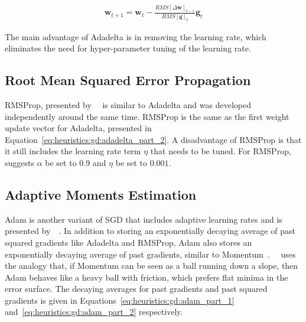 \begin{equation}
      \label{eq:heuristics:gd:adadelta_part_6}
      \begin{split}
            \boldsymbol{w}_{t+1} = \boldsymbol{w}_{t} - \frac{RMS[\Delta \boldsymbol{w}]_{t-1}}{RMS[\boldsymbol{g}]_{t}} \boldsymbol{g}_{t}
      \end{split}
\end{equation}

The main advantage of \acs{Adadelta} is in removing the learning rate, which eliminates the need for hyper-parameter tuning of the learning rate.

\subsection{Root Mean Squared Error Propagation}\label{sec:heuristics:rmsprop}

\Acf{RMSProp}, presented by~\citeauthor{ref:hinton:2012}~\cite{ref:hinton:2012} is similar to \acs{Adadelta}  and was developed independently around the same time. \acs{RMSProp} is the same as the first weight update vector for \acs{Adadelta}, presented in Equation~\eqref{eq:heuristics:gd:adadelta_part_2}. A disadvantage of \acs{RMSProp} is that it still includes the learning rate term $\eta$ that needs to be tuned. For \acs{RMSProp},~\citeauthor{ref:hinton:2012}~\cite{ref:hinton:2012} suggests $\alpha$ be set to 0.9 and $\eta$ be set to $0.001$.


\subsection{Adaptive Moments Estimation}\label{sec:heuristics:adam}

\Acf{Adam} is another variant of \acs{SGD} that includes adaptive learning rates and is presented by~\citeauthor{ref:kingma:2014}~\cite{ref:kingma:2014}. In addition to storing an exponentially decaying average of past squared gradients like \acs{Adadelta} and \acs{RMSProp}, \acs{Adam} also stores an exponentially decaying average of past gradients, similar to \acs{Momentum}~\cite{ref:ruder:2016}.~\citeauthor{ref:heusel:2017}~\cite{ref:heusel:2017} uses the analogy that, if \acs{Momentum} can be seen as a ball running down a slope, then \acs{Adam} behaves like a heavy ball with friction, which prefers flat minima in the error surface. The decaying averages for past gradients and past squared gradients is given in Equations~\eqref{eq:heuristics:gd:adam_part_1} and~\eqref{eq:heuristics:gd:adam_part_2} respectively.

